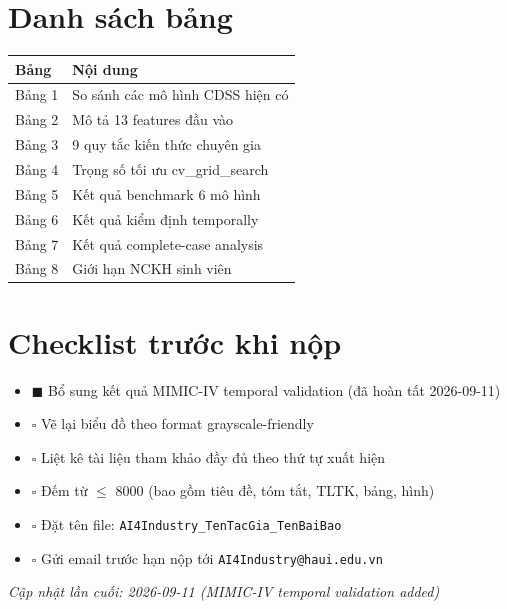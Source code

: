 \documentclass[13pt,a4paper]{article}
\begin{document}
\section*{Danh sách bảng}

\begin{table}[H]
\centering
\begin{tabular}{ll}
\toprule
Bảng & Nội dung \\
\midrule
Bảng 1 & So sánh các mô hình CDSS hiện có \\
Bảng 2 & Mô tả 13 features đầu vào \\
Bảng 3 & 9 quy tắc kiến thức chuyên gia \\
Bảng 4 & Trọng số tối ưu cv\_grid\_search \\
Bảng 5 & Kết quả benchmark 6 mô hình \\
Bảng 6 & Kết quả kiểm định temporally \\
Bảng 7 & Kết quả complete-case analysis \\
Bảng 8 & Giới hạn NCKH sinh viên \\
\bottomrule
\end{tabular}
\end{table}

\section*{Checklist trước khi nộp}

\begin{itemize}
    \item[] $\blacksquare$ Bổ sung kết quả MIMIC-IV temporal validation (đã hoàn tất 2026-09-11)
    \item[] $\square$ Vẽ lại biểu đồ theo format grayscale-friendly
    \item[] $\square$ Liệt kê tài liệu tham khảo đầy đủ theo thứ tự xuất hiện
    \item[] $\square$ Đếm từ $\le$ 8000 (bao gồm tiêu đề, tóm tắt, TLTK, bảng, hình)
    \item[] $\square$ Đặt tên file: \texttt{AI4Industry\_TenTacGia\_TenBaiBao}
    \item[] $\square$ Gửi email trước hạn nộp tới \texttt{AI4Industry@haui.edu.vn}
\end{itemize}

\vspace{1cm}

\begin{center}
    \textit{Cập nhật lần cuối: 2026-09-11 (MIMIC-IV temporal validation added)}
\end{center}
\end{document}
